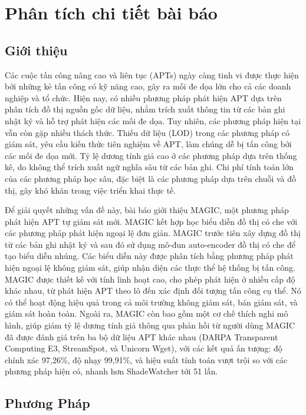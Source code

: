 \section{Phân tích chi tiết bài báo}
\subsection{Giới thiệu}
Các cuộc tấn công nâng cao và liên tục (APTs) ngày càng tinh vi được thực hiện bởi những kẻ tấn công có kỹ năng cao, gây ra mối đe dọa lớn cho cả các doanh nghiệp và tổ chức. Hiện nay, có nhiều phương pháp phát hiện APT dựa trên phân tích đồ thị nguồn gốc dữ liệu, nhằm trích xuất thông tin từ các bản ghi nhật ký và hỗ trợ phát hiện các mối đe dọa. Tuy nhiên, các phương pháp hiện tại vẫn còn gặp nhiều thách thức. Thiếu dữ liệu (LOD) trong các phương pháp có giám sát, yêu cầu kiến thức tiên nghiệm về APT, làm chúng dễ bị tấn công bởi các mối đe dọa mới. Tỷ lệ dương tính giả cao ở các phương pháp dựa trên thống kê, do không thể trích xuất ngữ nghĩa sâu từ các bản ghi. Chi phí tính toán lớn của các phương pháp học sâu, đặc biệt là các phương pháp dựa trên chuỗi và đồ thị, gây khó khăn trong việc triển khai thực tế.

Để giải quyết những vấn đề này, bài báo giới thiệu MAGIC, một phương pháp phát hiện APT tự giám sát mới. MAGIC kết hợp học biểu diễn đồ thị có che với các phương pháp phát hiện ngoại lệ đơn giản. MAGIC trước tiên xây dựng đồ thị từ các bản ghi nhật ký và sau đó sử dụng mô-đun auto-encoder đồ thị có che để tạo biểu diễn nhúng. Các biểu diễn này được phân tích bằng phương pháp phát hiện ngoại lệ không giám sát, giúp nhận diện các thực thể hệ thống bị tấn công.
MAGIC được thiết kế với tính linh hoạt cao, cho phép phát hiện ở nhiều cấp độ khác nhau, từ phát hiện APT theo lô đến xác định đối tượng tấn công cụ thể. Nó có thể hoạt động hiệu quả trong cả môi trường không giám sát, bán giám sát, và giám sát hoàn toàn. Ngoài ra, MAGIC còn bao gồm một cơ chế thích nghi mô hình, giúp giảm tỷ lệ dương tính giả thông qua phản hồi từ người dùng
MAGIC đã được đánh giá trên ba bộ dữ liệu APT khác nhau (DARPA Transparent Computing E3, StreamSpot, và Unicorn Wget), với các kết quả ấn tượng: độ chính xác 97,26\%, độ nhạy 99,91\%, và hiệu suất tính toán vượt trội so với các phương pháp hiện có, nhanh hơn ShadeWatcher tới 51 lần.

\subsection{Phương Pháp}

